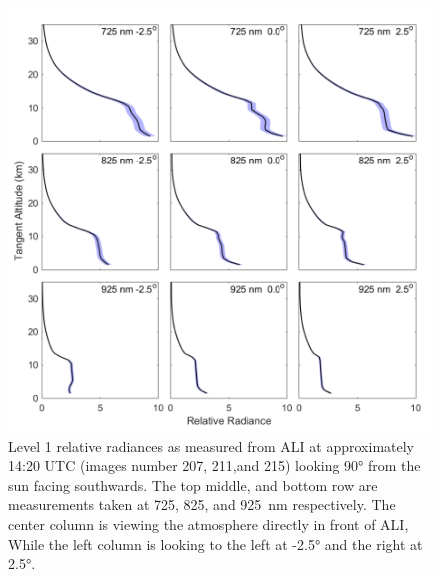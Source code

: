 \documentclass[12pt]{article}
\begin{document}
\newpage

\begin{figure}
\includegraphics[width=1.0\textwidth]{./Images/5-2-AliRadiancesWithError.pdf}
    \caption{Level 1 relative radiances as measured from ALI at approximately 14:20 UTC (images number 207, 211,and 215) looking 90\si{\degree} from the sun facing southwards. The top middle, and bottom row are measurements taken at 725, 825, and 925~nm respectively. The center column is viewing the atmosphere directly in front of ALI, While the left column is looking to the left at -2.5\si{\degree} and the right at 2.5\si{\degree}. }
    \label{fig:AliRadiances}
\end{figure}

\newpage
\end{document}
